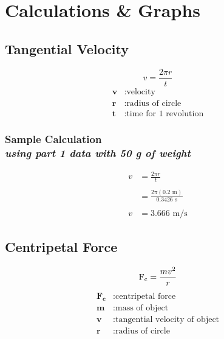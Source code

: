 
\section{Calculations \& Graphs}

\vspace{-0.5cm}
\singlespacing


\subsection{Tangential Velocity} 

{\centering
\begin{equation}
	v =  \frac{2 \pi r}{t} 
	\label{eq:tvelocity}
\end{equation}
\begin{align*}
	\mathbf{v} &: \text{velocity} \\
	\mathbf{r} &: \text{radius of circle} \\
	\mathbf{t} &: \text{time for 1 revolution}
\end{align*}}

\subsubsection{Sample Calculation \\ {\normalfont \small\textit{using part 1 data with 50 g of weight}}}

{\centering
\begin{align*}
	v &=  \frac{2 \pi r}{t} \\ \\
		&=  \frac{2 \pi (0.2\text{ m})}{0.3426\text{ s}} \\ \\
	v	&= \boxed{3.666 \text{ m/s}} 
\end{align*}}


\subsection{Centripetal Force} 

{\centering
\begin{equation}
	\text{F\textsubscript{c}} = \frac{mv^2}{r}
	\label{eq:centriForce}
\end{equation}
\begin{align*}
	\mathbf{F_c} &: \text{centripetal force} \\
	\mathbf{m} &: \text{mass of object} \\
	\mathbf{v} &: \text{tangential velocity of object} \\
	\mathbf{r} &: \text{radius of circle}
\end{align*}}


